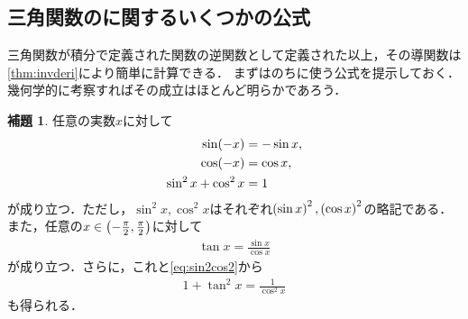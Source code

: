 \documentclass[11pt,a4paper]{ltjsarticle}
\newcommand*{\intd}{\dl2}
\theoremstyle{definition}
\newtheorem{lemma}[dfn]{補題}
\begin{document}
\subsection{三角関数のに関するいくつかの公式} \label{subsec:identity}

三角関数が積分で定義された関数の逆関数として定義された以上，その導関数は\cref{thm:invderi}により簡単に計算できる．
まずはのちに使う公式を提示しておく．幾何学的に考察すればその成立はほとんど明らかであろう．

\begin{lemma} \label{lemma:sin2cos2}
  任意の実数$x$に対して
  \begin{align}
    \apply{\sin}{-x} & = - \sin x,
    \label{eq:sinodd} \\
    \apply{\cos}{-x} & = \cos x,
    \label{eq:coseven} \\
    \sin^2 x + \cos^2 x & = 1
    \label{eq:sin2cos2}
  \end{align}
  が成り立つ．ただし，$\sin^2 x, \cos^2 x$はそれぞれ$\paren{\sin x}^2 ,\paren{\cos x}^2$の略記である．
  また，任意の$x \in \interval{op}{- \frac{\pi}{2}, \frac{\pi}{2}}$に対して
  \begin{align}
    \tan x = \frac{\sin x}{\cos x}
    \label{eq:tanfrac}
  \end{align}
  が成り立つ．さらに，これと\cref{eq:sin2cos2}から
  \begin{align}
    1 + \tan ^2 x = \frac{1}{\cos^2 x}
    \label{eq:tancos}
  \end{align}
  も得られる．
\end{lemma}

%
\end{document}
